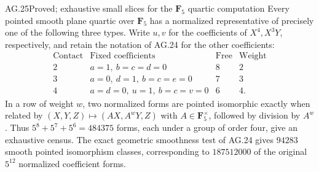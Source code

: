 \begin{claim}{AG.25}{Proved; exhaustive small slices for the $\mathbf F_5$ quartic computation}
Every pointed smooth plane quartic over $\mathbf F_5$
has a normalized representative of precisely one of the
following three types. Write $u,v$ for the coefficients
of $X^4,X^3Y$, respectively, and retain the notation
of AG.24 for the other coefficients:
\[
 \begin{array}{c|c|c|c}
 \text{Contact}&\text{Fixed coefficients}
       &\text{Free}&\text{Weight}\\ \hline
 2&a=1,\ b=c=d=0&8&2\\
 3&a=0,\ d=1,\ b=c=e=0&7&3\\
 4&a=d=0,\ u=1,\ b=c=v=0&6&4.
 \end{array}
\]
In a row of weight $w$, two normalized forms are pointed
isomorphic exactly when related by
$(X,Y,Z)\mapsto(AX,A^wY,Z)$ with
$A\in\mathbf F_5^\times$, followed by division by $A^w$.
Thus $5^8+5^7+5^6=484375$ forms, each under a group of
order four, give an exhaustive census. The exact geometric
smoothness test of AG.24 gives $94283$ smooth pointed
isomorphism classes, corresponding to $187512000$ of
the original $5^{12}$ normalized coefficient forms.
\end{claim}
